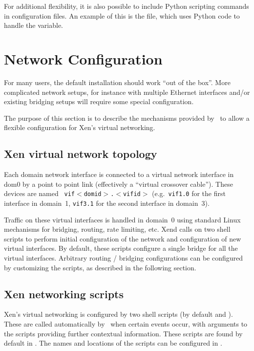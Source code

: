 For additional flexibility, it is also possible to include Python
scripting commands in configuration files.  An example of this is the
 file, which uses Python code to handle the
 variable.




\section{Network Configuration}

For many users, the default installation should work ``out of the
box''.  More complicated network setups, for instance with multiple
Ethernet interfaces and/or existing bridging setups will require some
special configuration.

The purpose of this section is to describe the mechanisms provided by
\xend\ to allow a flexible configuration for Xen's virtual networking.

\subsection{Xen virtual network topology}

Each domain network interface is connected to a virtual network
interface in dom0 by a point to point link (effectively a ``virtual
crossover cable'').  These devices are named {\tt
  vif$<$domid$>$.$<$vifid$>$} (e.g.\ {\tt vif1.0} for the first
interface in domain~1, {\tt vif3.1} for the second interface in
domain~3).

Traffic on these virtual interfaces is handled in domain~0 using
standard Linux mechanisms for bridging, routing, rate limiting, etc.
Xend calls on two shell scripts to perform initial configuration of
the network and configuration of new virtual interfaces.  By default,
these scripts configure a single bridge for all the virtual
interfaces.  Arbitrary routing / bridging configurations can be
configured by customizing the scripts, as described in the following
section.

\subsection{Xen networking scripts}

Xen's virtual networking is configured by two shell scripts (by
default  and ).  These are called
automatically by \xend\ when certain events occur, with arguments to
the scripts providing further contextual information.  These scripts
are found by default in .  The names and
locations of the scripts can be configured in
.


